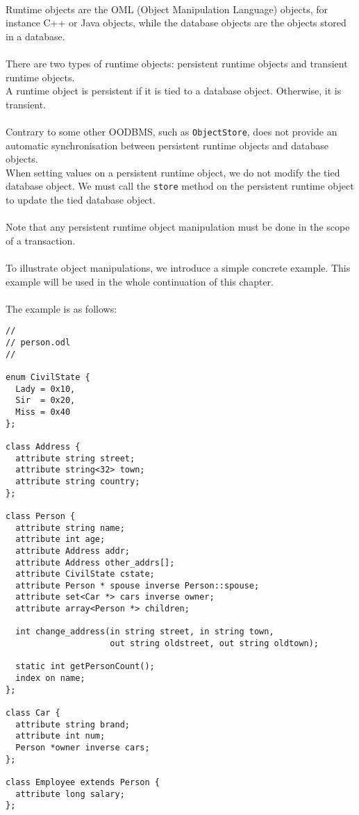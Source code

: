 \\
Runtime objects are the OML (Object Manipulation Language) objects,
for instance C++ or Java objects, while the database objects are
the objects stored in a database.
\\
\\
There are two types of runtime objects: persistent runtime objects and
transient runtime objects.
\\
A runtime object is persistent if it is tied to a database object.
Otherwise, it is  transient.
\\
\\
Contrary to some other OODBMS, such as \texttt{ObjectStore}, \eyedb does not
provide an automatic synchronisation between persistent runtime objects
and database objects.
\\
When setting values on a persistent runtime object, we do not modify
the tied database object.
We must call the \texttt{store} method on the persistent runtime object
to update the tied database object.
\\
\\
Note that any persistent runtime object manipulation must be done
in the scope of a transaction.
\\
\\
To illustrate object manipulations, we introduce a simple concrete
example.
This example will be used in the whole continuation of this chapter.
\\
\\
The example is as follows:
\verbsize
\begin{verbatim}
//
// person.odl
//

enum CivilState {
  Lady = 0x10,
  Sir  = 0x20,
  Miss = 0x40
};

class Address {
  attribute string street;
  attribute string<32> town;
  attribute string country;
};

class Person {
  attribute string name;
  attribute int age;
  attribute Address addr;
  attribute Address other_addrs[];
  attribute CivilState cstate;
  attribute Person * spouse inverse Person::spouse;
  attribute set<Car *> cars inverse owner;
  attribute array<Person *> children;

  int change_address(in string street, in string town,
                     out string oldstreet, out string oldtown);

  static int getPersonCount();
  index on name;
};

class Car {
  attribute string brand;
  attribute int num;
  Person *owner inverse cars;
};

class Employee extends Person {
  attribute long salary;
};
\end{verbatim}
